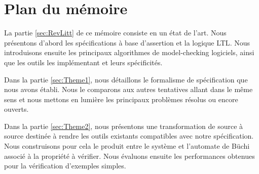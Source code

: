 \section{Plan du mémoire}  %

La partie \ref{sec:RevLitt} de ce mémoire consiste en un état de l'art. Nous présentons
d'abord les spécifications à base d'assertion et la logique \ac{LTL}. Nous
introduisons ensuite les principaux algorithmes de model-checking
logiciels, ainsi que les outils les implémentant et leurs spécificités.

Dans la partie \ref{sec:Theme1}, nous détaillons le formalisme de spécification que
nous avons établi. Nous le comparons aux autres tentatives allant dans
le même sens et nous mettons en lumière les principaux problèmes
résolus ou encore ouverts.

Dans la partie \ref{sec:Theme2}, nous présentons une transformation de source à source
destinée à rendre les outils existants compatibles avec notre
spécification. Nous construisons pour cela le produit entre le système
et l'automate de Büchi associé à la propriété à vérifier. Nous évaluons
ensuite les performances obtenues pour la vérification d'exemples
simples.
